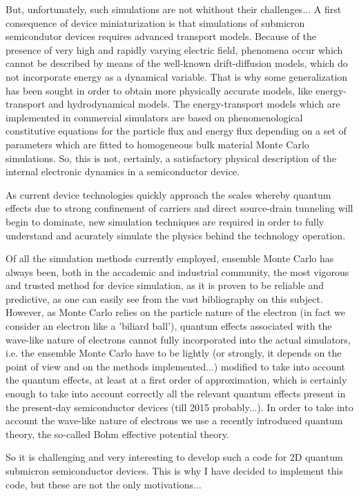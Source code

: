 \documentclass[12pt]{book}
\begin{document}
But, unfortunately, such simulations are not whithout their challenges... A first consequence of device miniaturization is that simulations of submicron semicondutor devices requires advanced transport models. Because of the presence of very high and rapidly varying electric field, phenomena occur which cannot be described by means of the well-known drift-diffusion models, which do not incorporate energy as a dynamical variable. That is why some generalization has been sought in order to obtain more physically accurate models, like energy-transport and hydrodynamical models. The energy-transport models which are implemented in commercial simulators are based on phenomenological constitutive equations for the particle flux and energy flux depending on a set of parameters which are fitted to homogeneous bulk material Monte Carlo simulations. So, this is not, certainly, a satisfactory physical description of the internal electronic dynamics in a semiconductor device.

As current device technologies quickly approach the scales whereby quantum effects due to strong confinement of carriers and direct source-drain tunneling will begin to dominate, new simulation techniques are required in order to fully understand and acurately simulate the physics behind the technology operation. 

Of all the simulation methods currently employed, ensemble Monte Carlo has always been, both in the accademic and industrial community, the most vigorous and trusted method for device simulation, as it is proven to be reliable and predictive, as one can easily see from the vast bibliography on this subject. However, as Monte Carlo relies on the particle nature of the electron (in fact we consider an electron like a 'biliard ball'), quantum effects associated with the wave-like nature of electrons cannot fully incorporated into the actual simulators, i.e. the ensemble Monte Carlo have to be lightly (or strongly, it depends on the point of view and on the methods implemented...) modified to take into account the quantum effects, at least at a first order of approximation, which is certainly enough to take into account correctly all the relevant quantum effects present in the present-day semiconductor devices (till 2015 probably...). In order to take into account the wave-like nature of electrons we use a recently introduced quantum theory, the so-called Bohm effective potential theory.

So it is challenging and very interesting to develop such a code for 2D quantum submicron semiconductor devices. This is why I have decided to implement this code, but these are not the only motivations... 
\end{document}
